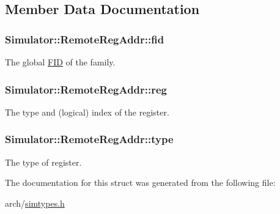 \subsection{Member Data Documentation}
\hypertarget{struct_simulator_1_1_remote_reg_addr_ae0ae7ccbf41930eb6d730892cc81fcf1}{
\subsubsection[{fid}]{ Simulator\+::\+Remote\+Reg\+Addr\+::fid}}\label{struct_simulator_1_1_remote_reg_addr_ae0ae7ccbf41930eb6d730892cc81fcf1}


The global \hyperlink{struct_simulator_1_1_f_i_d}{F\+I\+D} of the family. 

\hypertarget{struct_simulator_1_1_remote_reg_addr_a8d68911ba43e8673fc27cf04bc6b48ef}{
\subsubsection[{reg}]{ Simulator\+::\+Remote\+Reg\+Addr\+::reg}}\label{struct_simulator_1_1_remote_reg_addr_a8d68911ba43e8673fc27cf04bc6b48ef}


The type and (logical) index of the register. 

\hypertarget{struct_simulator_1_1_remote_reg_addr_a5f1f93aab024bf76a1b53907a935ec90}{
\subsubsection[{type}]{ Simulator\+::\+Remote\+Reg\+Addr\+::type}}\label{struct_simulator_1_1_remote_reg_addr_a5f1f93aab024bf76a1b53907a935ec90}


The type of register. 



The documentation for this struct was generated from the following file\+:\begin{DoxyCompactItemize}
\item 
arch/\hyperlink{simtypes_8h}{simtypes.\+h}\end{DoxyCompactItemize}
